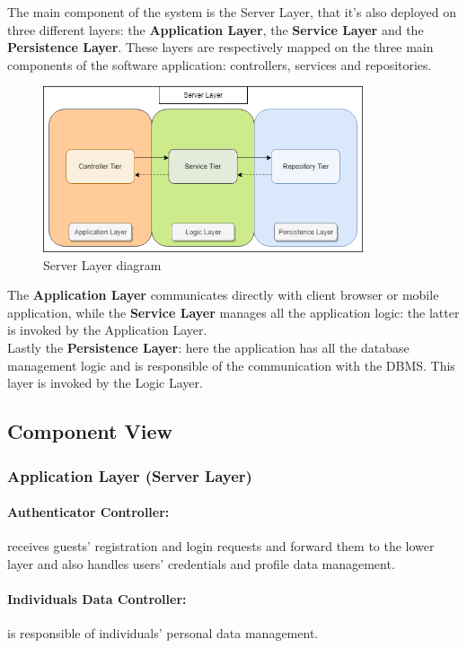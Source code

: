\documentclass[a4paper]{article}
\begin{document}
\newpage The main component of the system is the Server Layer, that it's also deployed on three different layers: the \textbf{Application Layer}, the \textbf{Service Layer} and the \textbf{Persistence Layer}.
These layers are respectively mapped on the three main components of the software application: controllers, services and repositories.
\begin{figure}[!htpb]
    	\centering
    	\includegraphics[width=0.84\textwidth,keepaspectratio]{DD/images/ServerLayer.png}
    	\caption{Server Layer diagram}
\end{figure}
\newline
The \textbf{Application Layer} communicates directly with client browser or mobile application, while the \textbf{Service Layer} manages all the application logic: the latter is invoked by the Application Layer. \\
Lastly the \textbf{Persistence Layer}: here the application has all the database management logic and is responsible of the communication with the DBMS. This layer is invoked by the Logic Layer.

\newpage
\subsection{Component View}
    \subsubsection{Application Layer (Server Layer)}
    \paragraph{Authenticator Controller:}
    receives guests' registration and login requests and forward them to the lower layer and also handles users' credentials and profile data management.
    
    \paragraph{Individuals Data Controller:}
    is responsible of individuals' personal data management.
    
\end{document}
